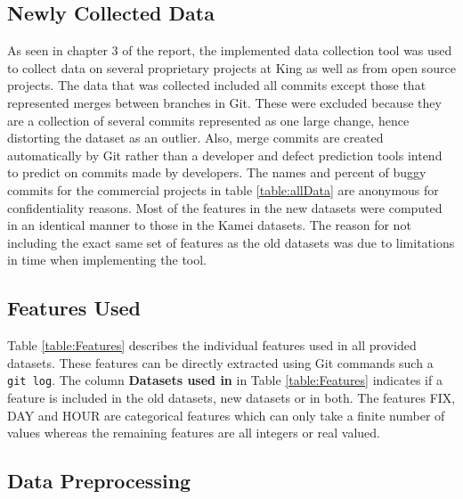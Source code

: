 \documentclass[../main.tex]{subfiles}
\begin{document}
\subsection{Newly Collected Data}

As seen in chapter 3 of the report, the implemented data collection tool was used to collect data on several proprietary projects at King as well as from open source projects. The data that was collected included all commits except those that represented merges between branches in Git. These were excluded because they are a collection of several commits represented as one large change, hence distorting the dataset as an outlier. Also, merge commits are created automatically by Git rather than a developer and defect prediction tools intend to predict on commits made by developers. The names and percent of buggy commits for the commercial projects in table \ref{table:allData} are anonymous for confidentiality reasons. Most of the features in the new datasets were computed in an identical manner to those in the Kamei datasets. The reason for not including the exact same set of features as the old datasets was due to limitations in time when implementing the tool. 

\subsection{Features Used}

Table \ref{table:Features} describes the individual features used in all provided datasets. These features can be directly extracted using Git commands such a \texttt{git log}. The column \textbf{Datasets used in} in Table \ref{table:Features} indicates if a feature is included in the old datasets, new datasets or in both. The features FIX, DAY and HOUR are categorical features which can only take a finite number of values whereas the remaining features are all integers or real valued. 

\subsection{Data Preprocessing}
\end{document}
